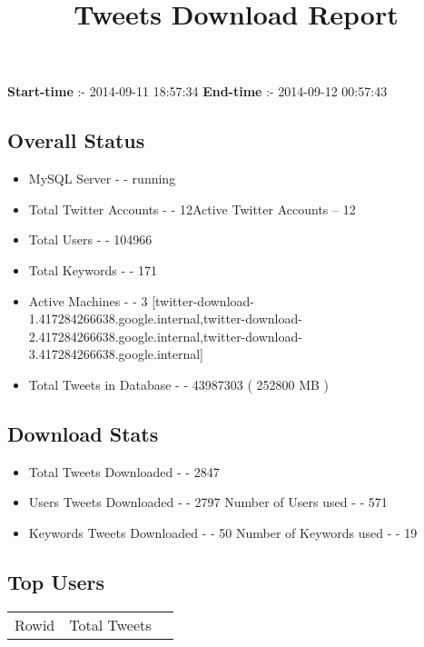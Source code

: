\documentclass{article}\usepackage[T1]{fontenc}
\begin{document}
\title{\textbf{Tweets Download Report}}
               \date{}
                \maketitle
               \centerline{\textbf{Start-time} :- 2014-09-11 18:57:34 \hspace{40pt} \textbf{End-time} :- 2014-09-12 00:57:43}               \subsection*{Overall Status}                \begin{itemize}                \item MySQL Server - - running               \item Total Twitter Accounts - - 12\newline Active Twitter Accounts -- 12               \item Total Users - - 104966               \item Total Keywords - - 171               \item Active Machines - - 3 [twitter-download-1.417284266638.google.internal,twitter-download-2.417284266638.google.internal,twitter-download-3.417284266638.google.internal]               \item Total Tweets in Database - - 43987303 ( 252800 MB )               \end{itemize}               \subsection*{Download Stats}                \begin{itemize}                \item Total Tweets Downloaded - - 2847               \item Users Tweets Downloaded - - 2797 \newline Number of Users used - - 571               \item Keywords Tweets Downloaded - - 50 \newline Number of Keywords used - - 19              \end{itemize}              \subsection*{Top Users}\begin{tabular}{|c|c|c|}         \hline         Rowid & Total Tweets \\ 

\end{tabular}
\end{document}
